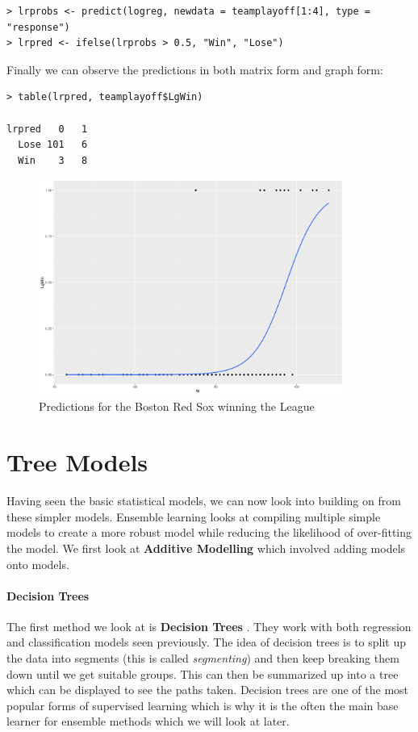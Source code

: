 \documentclass[11pt,a4paper]{report}
\begin{document}
\begin{lstlisting}[basicstyle=\scriptsize]
> lrprobs <- predict(logreg, newdata = teamplayoff[1:4], type = "response")
> lrpred <- ifelse(lrprobs > 0.5, "Win", "Lose")
\end{lstlisting}
Finally we can observe the predictions in both matrix form and graph form:

\begin{lstlisting}
> table(lrpred, teamplayoff$LgWin)
      
lrpred   0   1
  Lose 101   6
  Win    3   8
\end{lstlisting}

\begin{figure}[ht]
    \centering
    \includegraphics[width = 10cm]{photographs/logregpred.pdf}
    \caption{Predictions for the Boston Red Sox winning the League}
    \label{fig:log1}
\end{figure}




\chapter{Tree Models}
Having seen the basic statistical models, we can now look into building on from these simpler models. Ensemble learning looks at compiling multiple simple models to create a more robust model while reducing the likelihood of over-fitting the model. We first look at \textbf{Additive Modelling} which involved adding models onto models.

\subsubsection{Decision Trees}
The first method we look at is \textbf{Decision Trees} \cite{BreimanDT}. They work with both regression and classification models seen previously.
The idea of decision trees is to split up the data into segments (this is called \textit{segmenting}) and then keep breaking them down until we get suitable groups. This can then be summarized up into a tree which can be displayed to see the paths taken.
Decision trees are one of the most popular forms of supervised learning which is why it is the often the main base learner for ensemble methods which we will look at later.
\end{document}
